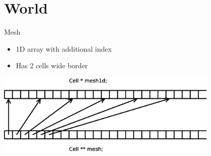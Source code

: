 \documentclass{beamer}
\begin{document}
\section{World}

\begin{frame}{Mesh}
    \begin{itemize}
        \item 1D array with additional index
        \item Has 2 cells wide border
    \end{itemize}

    \begin{center}
        \includegraphics[width=0.8\textwidth]{mesh}
    \end{center}
\end{frame}
\end{document}
